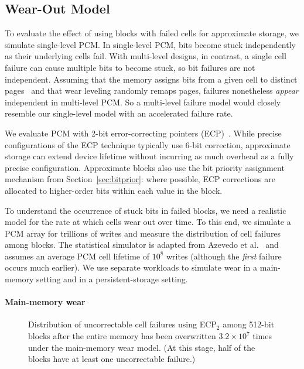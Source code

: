 \documentclass[prodmode,acmtocs]{acmsmall}
\begin{document}
\subsection{Wear-Out Model}
\label{sec:wearmodel}

To evaluate the effect of using blocks with failed cells for approximate
storage, we simulate single-level PCM.
In single-level PCM,
bits become
stuck independently as their underlying cells fail.
With multi-level designs, in contrast, a single cell failure can cause
multiple bits to become stuck, so bit failures are not independent.
Assuming that the memory assigns bits from a given cell to distinct
pages~\cite{mlcflash} and that wear leveling randomly remaps pages,
failures nonetheless \emph{appear} independent in multi-level PCM.
So a multi-level
failure model would closely resemble our single-level model with an
accelerated failure rate.

We evaluate PCM with 2-bit error-correcting pointers (ECP)~\cite{ecp}.
While precise configurations of the ECP technique typically use 6-bit
correction, approximate storage can extend device lifetime without incurring as
much overhead as a fully precise configuration.
Approximate blocks also use the bit priority assignment mechanism from
Section~\ref{sec:bitprior}: where possible, ECP corrections are allocated to
higher-order bits within each value in the block.

To understand the occurrence of stuck bits in failed blocks,
we need a realistic model for the rate at which cells wear out over time.
To this end,
we simulate a PCM array for trillions of writes and
measure the distribution of cell failures among blocks.
The statistical simulator is adapted from Azevedo et al.~\cite{zombie} and
assumes an average PCM cell lifetime of $10^8$ writes (although
the \emph{first} failure occurs much earlier).
We use separate
workloads to simulate wear in a main-memory setting and in a persistent-storage
setting.

\paragraph{Main-memory wear}

\begin{figure}[t]
    \centering
    
    \caption{
        Distribution of uncorrectable cell failures using ECP$_2$ among
        512-bit blocks
        after the entire memory has been overwritten
        $3.2 \times 10^{7}$ times under the main-memory wear model. (At this
        stage, half of the blocks have at least one uncorrectable failure.)
    }
    \label{fig:hist}
\end{figure}
\end{document}
